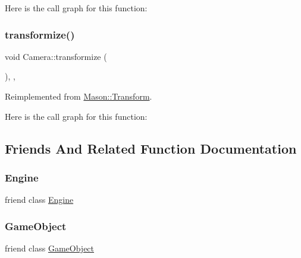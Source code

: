 Here is the call graph for this function\+:
\hypertarget{class_mason_1_1_camera_a27ff2d3ad004a49db2ae508ac6e9d3c2}{}\label{class_mason_1_1_camera_a27ff2d3ad004a49db2ae508ac6e9d3c2} 
\subsubsection{\texorpdfstring{transformize()}{transformize()}}
{\footnotesize\ttfamily void Camera\+::transformize (\begin{DoxyParamCaption}{ }\end{DoxyParamCaption})\hspace{0.3cm}{\ttfamily [override]}, {\ttfamily [protected]}, {\ttfamily [virtual]}}



Reimplemented from \hyperlink{class_mason_1_1_transform_a4dd61568d49044377f3312397ffdafd1}{Mason\+::\+Transform}.

Here is the call graph for this function\+:


\subsection{Friends And Related Function Documentation}
\hypertarget{class_mason_1_1_camera_a3e1914489e4bed4f9f23cdeab34a43dc}{}\label{class_mason_1_1_camera_a3e1914489e4bed4f9f23cdeab34a43dc} 
\subsubsection{\texorpdfstring{Engine}{Engine}}
{\footnotesize\ttfamily friend class \hyperlink{class_mason_1_1_engine}{Engine}\hspace{0.3cm}{\ttfamily [friend]}}

\hypertarget{class_mason_1_1_camera_a00df87c957d8f7ee0fc51f07a0542f4a}{}\label{class_mason_1_1_camera_a00df87c957d8f7ee0fc51f07a0542f4a} 
\subsubsection{\texorpdfstring{Game\+Object}{GameObject}}
{\footnotesize\ttfamily friend class \hyperlink{class_mason_1_1_game_object}{Game\+Object}\hspace{0.3cm}{\ttfamily [friend]}}




